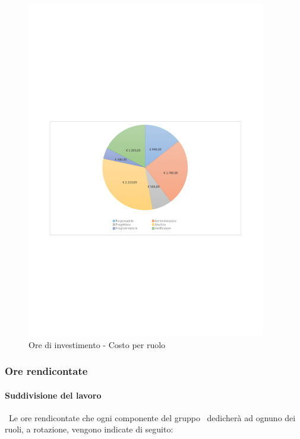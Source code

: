 \documentclass[../PianoProgetto.tex]{subfiles}
\begin{document}
	\begin{figure}[H]
		\centering
		\includegraphics[width=0.93\textwidth , trim=1.5cm 9cm 1.5cm 9cm]{grafici/Riepilogo/Investimento/costo}
			\caption{Ore di investimento - Costo per ruolo}
		\label{fig:CircleChart-investimento_costo}
	\end{figure}
\vfill	

	\subsubsection{Ore rendicontate}
				\paragraph{Suddivisione del lavoro}\
					Le ore rendicontate che ogni componente del gruppo \leaf\ dedicherà ad ognuno dei ruoli, a rotazione, vengono indicate di seguito:
	
\end{document}
